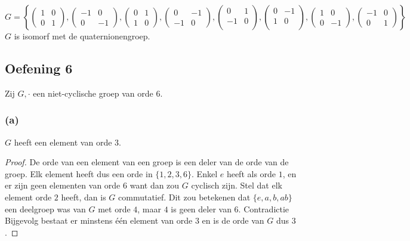 \documentclass[main.tex]{subfiles}
\begin{document}
\[ 
G = 
\left\{ 
  \begin{pmatrix}
    1 & 0\\
    0 & 1
  \end{pmatrix}
,
  \begin{pmatrix}
    -1 & 0\\
    0 & -1
  \end{pmatrix}
,
  \begin{pmatrix}
    0 & 1\\
    1 & 0
  \end{pmatrix}
,
  \begin{pmatrix}
    0 & -1\\
    -1 & 0
  \end{pmatrix}
,
  \begin{pmatrix}
     0 & 1\\
    -1 & 0\\
  \end{pmatrix}
,
  \begin{pmatrix}
     0 & -1\\
    1 & 0\\
  \end{pmatrix}
,
  \begin{pmatrix}
    1 & 0\\
    0 & -1
  \end{pmatrix}
,
  \begin{pmatrix}
    -1 & 0\\
    0 & 1
  \end{pmatrix}
\right\}
\]
$G$ is isomorf met de quaternionengroep.

\subsection*{Oefening 6}
\label{oza:oz1-oef6}
Zij $G,\cdot$ een niet-cyclische groep van orde $6$.

\subsubsection*{(a)}
$G$ heeft een element van orde $3$.

\begin{proof}
  De orde van een element van een groep is een deler van de orde van de groep.
  Elk element heeft dus een orde in $\{ 1, 2, 3, 6 \}$.
  Enkel $e$ heeft als orde $1$, en er zijn geen elementen van orde $6$ want dan zou $G$ cyclisch zijn.
  Stel dat elk element orde $2$ heeft, dan is $G$ commutatief.
  Dit zou betekenen dat $\{ e,a,b,ab \}$ een deelgroep was van $G$ met orde $4$, maar $4$ is geen deler van $6$. Contradictie
  Bijgevolg bestaat er minstens \'e\'en element van orde $3$ en is de orde van $G$ dus $3$.
\end{proof}
\end{document}
